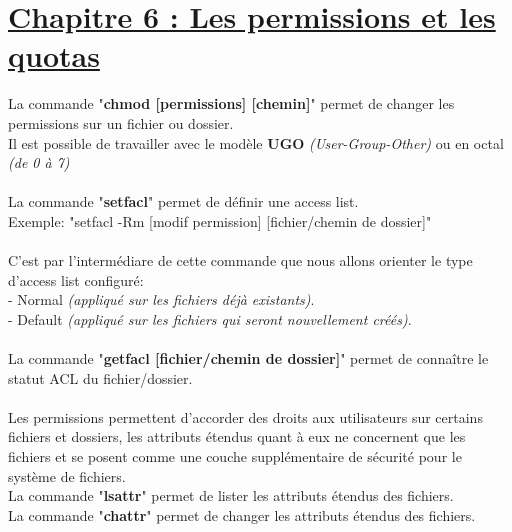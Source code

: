 \documentclass[12pt, a4paper]{article}
\begin{document}
\section*{\underline{Chapitre 6 : Les permissions et les quotas}}
La commande "\textbf{chmod [permissions] [chemin]}" permet de changer les permissions sur un fichier ou dossier.\\
Il est possible de travailler avec le modèle \textbf{UGO} \emph{(User-Group-Other)} ou en octal \emph{(de 0 à 7)}\\
\\
La commande "\textbf{setfacl}" permet de définir une access list.\\
Exemple: "setfacl -Rm [modif permission] [fichier/chemin de dossier]"\\
\\
C'est par l'intermédiare de cette commande que nous allons orienter le type d'access list configuré:\\
- Normal \emph{(appliqué sur les fichiers déjà existants)}.\\
- Default \emph{(appliqué sur les fichiers qui seront nouvellement créés)}.\\
\\
La commande "\textbf{getfacl [fichier/chemin de dossier]}" permet de connaître le statut ACL du fichier/dossier.\\
\\
Les permissions permettent d'accorder des droits aux utilisateurs sur certains fichiers et dossiers, les attributs étendus quant à eux ne concernent que les fichiers et se posent comme une couche supplémentaire de sécurité pour le système de fichiers.\\
La commande "\textbf{lsattr}" permet de lister les attributs étendus des fichiers.\\
La commande "\textbf{chattr}" permet de changer les attributs étendus des fichiers.\\
\end{document}
